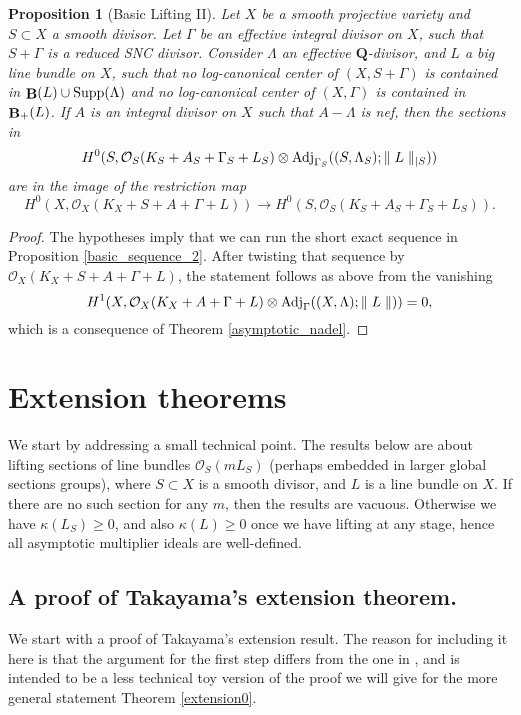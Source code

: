 \documentclass[11pt]{amsart}
\theoremstyle{plain}
\newtheorem{proposition}[theorem]{Proposition}
\theoremstyle{definition}
\newcommand{\QQ}{\mathbf{Q}}
\newcommand{\OO}{\mathcal  {O}}
\newcommand{\Adj}{{\rm Adj}}
\DeclareMathOperator{\BB}{{\bf B}}
\begin{document}
\begin{proposition}[Basic Lifting II]\label{basic_lifting_2}
Let $X$ be a smooth projective variety and $S\subset X$ a smooth divisor. Let $\Gamma$ be an effective integral divisor on $X$, such that $S + \Gamma$ is a reduced SNC divisor. Consider $\Lambda$ an 
effective $\QQ$-divisor, and $L$ a big line bundle on $X$, such that no log-canonical center of $(X,S + \Gamma)$ is contained in $\BB(L) \cup {\rm Supp }(\Lambda)$ and no log-canonical center of 
$(X, \Gamma)$ is contained in $\BB_{+} (L)$. If $A$ is an integral divisor on $X$ such that $A - \Lambda$ is nef, then the sections in 
$$H^0 (S, \OO_S (K_S + A_S + \Gamma_S + L_S) \otimes \Adj_{\Gamma_S} ((S, \Lambda_S); \parallel L \parallel_{|S}))$$ 
are in the image of the restriction map 
$$H^0 (X, \OO_X (K_X + S +  A + \Gamma + L))\longrightarrow  
H^0 (S, \OO_S (K_S +  A_S + \Gamma_S + L_S)).$$
\end{proposition}
\begin{proof}
The hypotheses imply that we can run the short exact sequence in Proposition \ref{basic_sequence_2}. 
After twisting that sequence by $\OO_X(K_X + S +  A + \Gamma + L)$, the statement follows as above from the vanishing
$$H^1 (X, \OO_X(K_X + A + \Gamma + L)\otimes \Adj_{\Gamma} ((X, \Lambda); \parallel L \parallel)) = 0,$$
which is a consequence of Theorem \ref{asymptotic_nadel}.
\end{proof}







\section{Extension theorems}

We start by addressing a small technical point. The results below are about lifting sections of 
line bundles $\OO_S(m L_S)$ (perhaps embedded in larger global sections groups), where $S \subset X$ is a smooth divisor, and $L$ is a line bundle on $X$. If there are no such section for any $m$, then the results are vacuous. Otherwise we have $\kappa (L_S) \ge 0$, and also $\kappa(L) \ge 0$ once we have lifting at any stage, hence all asymptotic multiplier ideals are well-defined.

\subsection*{A proof of Takayama's extension theorem.}
We start with a proof of Takayama's extension result. The reason for including it here is that the argument for the first step differs from the one in \cite{takayama}, and is intended to be a less technical toy version of the proof we will give for the more general statement Theorem \ref{extension0}. 
\end{document}
